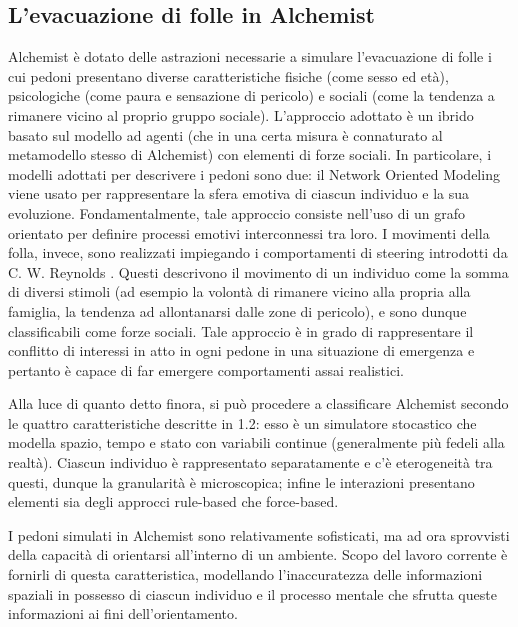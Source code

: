 \documentclass[12pt,a4paper,openright,oneside]{book}
\begin{document}
\subsection{L'evacuazione di folle in Alchemist}
Alchemist è dotato delle astrazioni necessarie a simulare l'evacuazione di folle i cui pedoni presentano diverse caratteristiche fisiche (come sesso ed età), psicologiche (come paura e sensazione di pericolo) e sociali (come la tendenza a rimanere vicino al proprio gruppo sociale). L'approccio adottato è un ibrido basato sul modello ad agenti (che in una certa misura è connaturato al metamodello stesso di Alchemist) con elementi di forze sociali. In particolare, i modelli adottati per descrivere i pedoni sono due: il Network Oriented Modeling \cite{TreurNetworkOrientedModeling2018} viene usato per rappresentare la sfera emotiva di ciascun individuo e la sua evoluzione. Fondamentalmente, tale approccio consiste nell'uso di un grafo orientato per definire processi emotivi interconnessi tra loro. I movimenti della folla, invece, sono realizzati impiegando i comportamenti di steering introdotti da C. W. Reynolds \cite{ReynoldsSteering2002}. Questi descrivono il movimento di un individuo come la somma di diversi stimoli (ad esempio la volontà di rimanere vicino alla propria alla famiglia, la tendenza ad allontanarsi dalle zone di pericolo), e sono dunque classificabili come forze sociali. Tale approccio è in grado di rappresentare il conflitto di interessi in atto in ogni pedone in una situazione di emergenza e pertanto è capace di far emergere comportamenti assai realistici. 

Alla luce di quanto detto finora, si può procedere a classificare Alchemist secondo le quattro caratteristiche descritte in 1.2: esso è un simulatore stocastico che modella spazio, tempo e stato con variabili continue (generalmente più fedeli alla realtà). Ciascun individuo è rappresentato separatamente e c'è eterogeneità tra questi, dunque la granularità è microscopica; infine le interazioni presentano elementi sia degli approcci rule-based che force-based.

I pedoni simulati in Alchemist sono relativamente sofisticati, ma ad ora sprovvisti della capacità di orientarsi all'interno di un ambiente. Scopo del lavoro corrente è fornirli di questa caratteristica, modellando l'inaccuratezza delle informazioni spaziali in possesso di ciascun individuo e il processo mentale che sfrutta queste informazioni ai fini dell'orientamento.
\end{document}
